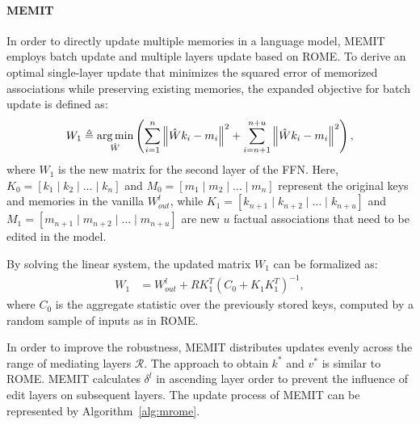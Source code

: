 \paragraph{MEMIT}
In order to directly update multiple memories in a language model, MEMIT employs batch update and multiple layers update based on ROME.
To derive an optimal single-layer update that minimizes the squared error of memorized associations while preserving existing memories, the expanded objective for batch update is defined as:
\begin{align}
    W_1 \triangleq \operatorname*{arg\,min}_{\hat{W}} \left( \sum_{i=1}^{n} \left\lVert \hat{W} k_i - m_i \right\rVert^2 + \sum_{i=n+1}^{n+u} \left\lVert \hat{W} k_i - m_i \right\rVert^2 \right),
\end{align}
where $W_1$ is the new matrix for the second layer of the FFN. Here, $K_0 = \left[ k_1 \mid k_2 \mid \dots \mid k_n \right]$ and $M_0 = \left[ m_1 \mid m_2 \mid \dots \mid m_n \right]$ represent the original keys and memories in the vanilla $W_{out}^l$, while $K_1 = \left[ k_{n+1} \mid k_{n+2} \mid \dots \mid k_{n+u} \right]$ and $M_1 = \left[ m_{n+1} \mid m_{n+2} \mid \dots \mid m_{n+u} \right]$ are new $u$ factual associations that need to be edited in the model.

By solving the linear system, the updated matrix $W_1$ can be formalized as:
\begin{align}
W_1  & = W_{out}^l + R K_1^T (C_0 + K_1 K_1^T)^{-1},
\end{align}
where $C_0$ is the aggregate statistic over the previously stored keys, computed by a random sample of inputs as in ROME.

In order to improve the robustness, MEMIT distributes updates evenly across the range of mediating layers $\mathcal{R}$.
The approach to obtain $k^*$ and $v^*$ is similar to ROME.
MEMIT calculates $\delta^l$ in ascending layer order to prevent the influence of edit layers on subsequent layers. 
The update process of MEMIT can be represented by Algorithm~\ref{alg:mrome}.

\setlength{\algomargin}{10pt}
\newlength{\commentWidth}
\setlength{\commentWidth}{7cm}
\newcommand{\atcp}[1]{\tcp*[f]{\makebox[\commentWidth]{#1\hfill}}}
\newcommand{\atcpl}[1]{\tcp*[r]{\makebox[\commentWidth]{#1\hfill}}}

